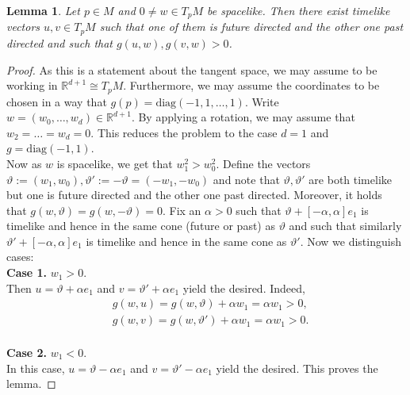 \documentclass[a4paper,10pt]{article}
\newtheorem{lemma}[theorem]{Lemma}
\numberwithin{equation}{section}
\newcommand{\R}{\mathbb{R}}
\begin{document}
\begin{lemma}\label{criterion_spacelike_vectors}
    Let $p \in M$ and $0 \neq w \in T_pM$ be spacelike. Then there exist timelike vectors $u, v \in T_pM$ such that one of them is future directed and the other one past directed and such that $g( u, w), g(v, w) >0$. 
\end{lemma}
\begin{proof}
    As this is a statement about the tangent space, we may assume to be working in $\R^{d+1}\cong T_pM$. Furthermore, we may assume the coordinates to be chosen in a way that $g(p) = \mathrm{diag}(-1, 1, \ldots, 1)$.
    Write $w = (w_0, \ldots, w_d) \in \R^{d+1}$.
    By applying a rotation, we may assume that $w_2 = \ldots = w_d = 0$. This reduces the problem to the case $d=1$ and $g= \mathrm{diag}(-1, 1)$.\\
    Now as $w$ is spacelike, we get that $w_1^2 > w_0^2$.
    Define the vectors $\vartheta := (w_1, w_0), \vartheta':=-\vartheta= (-w_1, -w_0)$ and note that $\vartheta, \vartheta'$ are both timelike but one is future directed and the other one past directed. Moreover, it holds that $g(w, \vartheta) = g(w, -\vartheta) =0$. Fix an $\alpha >0$ such that $\vartheta + [-\alpha, \alpha]e_1$ is timelike and hence in the same cone (future or past) as $\vartheta$ and such that similarly $\vartheta' + [-\alpha, \alpha]e_1$ is timelike and hence in the same cone as $\vartheta'$.
    Now we distinguish cases:\\
    \textbf{Case 1.} $w_1>0$. \\ 
    Then $u = \vartheta + \alpha e_1$ and $v = \vartheta' + \alpha e_1$ yield the desired. Indeed,
    \begin{align*}
        &g(w,u) = g(w, \vartheta) + \alpha w_1 = \alpha w_1 >0, \\
        &g(w,v) = g(w, \vartheta') + \alpha w_1 = \alpha w_1 >0.
    \end{align*}
    \\
    \textbf{Case 2.} $w_1<0$. \\
    In this case, $u = \vartheta - \alpha e_1$ and $v = \vartheta' - \alpha e_1$ yield the desired.
    This proves the lemma.
\end{proof}
\smallskip
\end{document}
